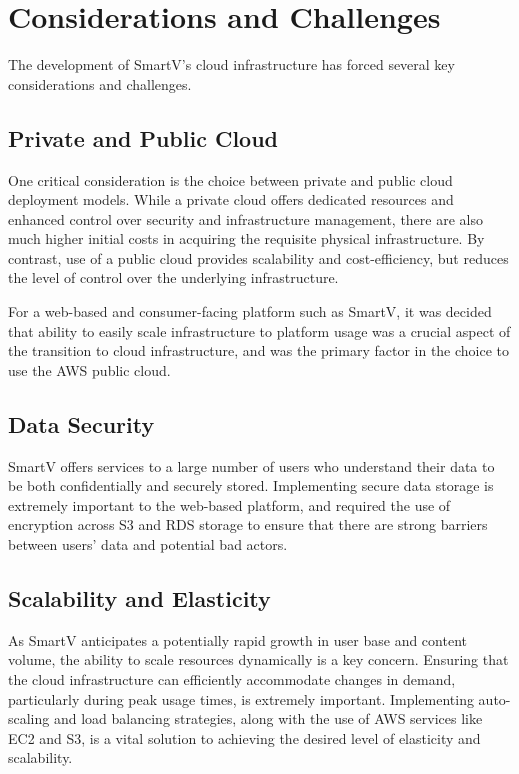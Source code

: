 \section{Considerations and Challenges}

The development of SmartV's cloud infrastructure has forced several key considerations and challenges.

\subsection{Private and Public Cloud}

One critical consideration is the choice between private and public cloud deployment models. While a private cloud offers dedicated resources and enhanced control over security and infrastructure management, there are also much higher initial costs in acquiring the requisite physical infrastructure. By contrast, use of a public cloud provides scalability and cost-efficiency, but reduces the level of control over the underlying infrastructure.

For a web-based and consumer-facing platform such as SmartV, it was decided that ability to easily scale infrastructure to platform usage was a crucial aspect of the transition to cloud infrastructure, and was the primary factor in the choice to use the AWS public cloud.

\subsection{Data Security}

SmartV offers services to a large number of users who understand their data to be both confidentially and securely stored. Implementing secure data storage is extremely important to the web-based platform, and required the use of encryption across S3 and RDS storage to ensure that there are strong barriers between users' data and potential bad actors.

\subsection{Scalability and Elasticity}

As SmartV anticipates a potentially rapid growth in user base and content volume, the ability to scale resources dynamically is a key concern. Ensuring that the cloud infrastructure can efficiently accommodate changes in demand, particularly during peak usage times, is extremely important. Implementing auto-scaling and load balancing strategies, along with the use of AWS services like EC2 and S3, is a vital solution to achieving the desired level of elasticity and scalability.


